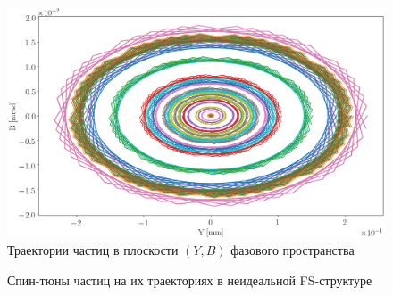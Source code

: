 \begin{figure}[H]
	\centering
	\includegraphics[height=.35\paperheight]{images/decoh_sim/YB-PHASE_SPACE_IMPERFECT_UNOPT}
	\caption{Траектории частиц в плоскости $(Y,B)$ фазового пространства\label{decoh:fig:yb_traj}} 
\end{figure}

\begin{figure}[H]
	\centering
	\hfill
	\hfill
	\caption{Спин-тюны частиц на их траекториях в неидеальной FS-структуре\label{decoh:fig:ST_on_traj}}
\end{figure}

